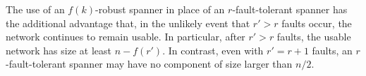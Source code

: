 \documentclass{cccg12}
\begin{document}
The use of an $f(k)$-robust spanner in place of an $r$-fault-tolerant
spanner has the additional advantage that, in the unlikely event that $r'>
r$ faults occur, the network continues to remain usable.  In particular,
after $r'>r$ faults, the usable network has size at least $n-f(r')$. In
contrast, even with $r'=r+1$ faults, an $r$-fault-tolerant spanner may
have no component of size larger than $n/2$.

%
%
%
%
%
%
\end{document}

